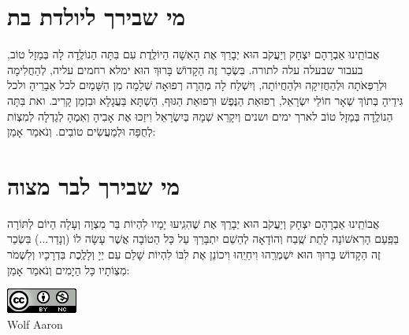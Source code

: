 \documentclass[a4paper, twoside, openany, parskip=half, 12pt]{article}
\begin{document}
\section*{מי שבירך ליולדת בת}
 אֲבוֹתֵֽינוּ אַבְרָהָם יִצְחָק וְיַעֲקֹב הוּא יְבָרֵךְ אֶת הָאִשָׁה הַיוֹלֶֽדֶת 
 עִם בִּתָּה הַנוֹלֶֽדָה לָה בְּמַזָל טוֹב,
בעבור שבעלה עלה לתורה. בִּשְׂכַר זֶה הַקָדוֹשׁ בָּרוּךְ הוּא ימלא רחמים עליה, לְהַחֲלִימָה וּלְרַפְּאֹתָה וּלְהַחֲזִיקָה וּלְהַחֲיוֹתָה, וְיִשְׁלַח לָה מְהֵרָה רְפוּאָה שְׁלֵמָה מִן הַשָּׁמַיִם לכל אֵבָרֵיהָ ולכל גִּידֵיהָ בְּתוֹךְ שְׁאָר חוֹלֵי יִשְׂרָאֵל, רְפוּאַת הַנֶּפֶשׁ וּרְפוּאַת הַגּוּף,   הַשְׁתָּא בַּעֲגָלָא וּבִזְמַן קָרִיב. ואת בִּתָּה הַנוֹלֶֽדָה בְּמַזָל טוֹב לארך ימים ושנים
  וְיִקָרֵא שְׁמָהּ בְּיִשְׂרָאֵל 
   וִיזַכּוּ אֶת אָבִיהָ וְאִמֶהָ לְגַדְלָה לְמִצְוֹת לְחֻפָּה וּלְמַעֲשִׂים טוֹבִים. וְנֹאמַר אָמֵן:\\

\section*{מי שבירך לבר מצוה}
אֲבוֹתֵֽינוּ אַבְרָהָם יִצְחָק וְיַעֲקֹב הוּא יְבָרֵךְ אֶת 
 שֶׁהִגִֽיעוּ יָמָיו לִהְיוֹת בַּר מִצְוָה וְעָלָה הַיוֹם לַתּוֹרָה בַּפַּֽעַם הָרִאשׁוֹנָה לָתֵת שֶֽׁבַח וְהוֹדָאָה לְהַשֵׁם יִתְבָּרַךְ עַל כָּל הַטוֹבָה אֲשֶׁר עָשָׂה לוֹ (וְנָדַר...) בִּשְׂכַר זֶה הַקָדוֹשׁ בָּרוּךְ הוּא יִשְׁמְרֵֽהוּ וִיחַיֵֽהוּ וִיכוֹנֵן אֶת לִבּוֹ לִהְיוֹת שָׁלֵם עִם יְיָ וְלָלֶֽכֶת בִּדְרָכָיו וְלִשְׁמֹר מִצְוֹתָיו כָּל הַיָמִים וְנֹאמַר אָמֵן:\\

\vfill



\includegraphics[scale=1]{cc.png}\\
Wolf Aaron

\end{document}
